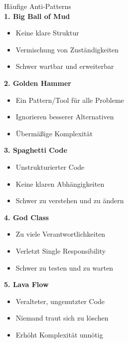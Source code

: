 \begin{concept}{Häufige Anti-Patterns}\\
\textbf{1. Big Ball of Mud}
\begin{itemize}
    \item Keine klare Struktur
    \item Vermischung von Zuständigkeiten
    \item Schwer wartbar und erweiterbar
\end{itemize}

\textbf{2. Golden Hammer}
\begin{itemize}
    \item Ein Pattern/Tool für alle Probleme
    \item Ignorieren besserer Alternativen
    \item Übermäßige Komplexität
\end{itemize}

\textbf{3. Spaghetti Code}
\begin{itemize}
    \item Unstrukturierter Code
    \item Keine klaren Abhängigkeiten
    \item Schwer zu verstehen und zu ändern
\end{itemize}

\textbf{4. God Class}
\begin{itemize}
    \item Zu viele Verantwortlichkeiten
    \item Verletzt Single Responsibility
    \item Schwer zu testen und zu warten
\end{itemize}

\textbf{5. Lava Flow}
\begin{itemize}
    \item Veralteter, ungenutzter Code
    \item Niemand traut sich zu löschen
    \item Erhöht Komplexität unnötig
\end{itemize}
\end{concept}

